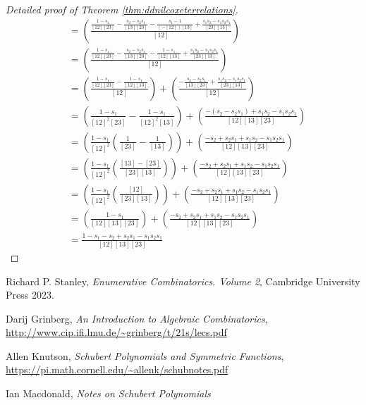 \documentclass{article}
\begin{document}
\begin{proof}[Detailed proof of Theorem \ref{thm:ddnilcoxeterrelations}]
\begin{align*}
        &= \left(\frac{\frac{1 - s_1}{[12][23]} - \frac{s_2 - s_2s_1}{[13][23]} - \frac{s_1 - 1}{(-[12])[13]} + \frac{s_1s_2 - s_1s_2s_1}{[23][13]}}{[12]}\right) \\
        &= \left(\frac{\frac{1 - s_1}{[12][23]} - \frac{s_2 - s_2s_1}{[13][23]} - \frac{1 - s_1}{[12][13]} + \frac{s_1s_2 - s_1s_2s_1}{[23][13]}}{[12]}\right) \\
        &= \left(\frac{\frac{1-s_1}{[12][23]} - \frac{1-s_1}{[12][13]}}{[12]}\right) +\left(\frac{-\frac{s_2 - s_2s_1}{[13][23]} + \frac{s_1s_2 - s_1s_2s_1}{[23][13]}}{[12]}\right) \\
        &= \left(\frac{1-s_1}{[12]^2[23]} - \frac{1-s_1}{[12]^2[13]}\right) + \left(\frac{-(s_2 - s_2s_1) + s_1s_2 - s_1s_2s_1}{[12][13][23]}\right)\\
        &= \left(\frac{1-s_1}{[12]^2}\left(\frac{1}{[23]}-\frac{1}{[13]}\right)\right) + \left(\frac{-s_2 + s_2s_1 + s_1s_2 - s_1s_2s_1}{[12][13][23]}\right)\\
        &= \left(\frac{1-s_1}{[12]^2}\left(\frac{[13]-[23]}{[23][13]}\right)\right) + \left(\frac{-s_2 + s_2s_1 + s_1s_2 - s_1s_2s_1}{[12][13][23]}\right)\\
        &= \left(\frac{1-s_1}{[12]^2}\left(\frac{[12]}{[23][13]}\right)\right) + \left(\frac{-s_2 + s_2s_1 + s_1s_2 - s_1s_2s_1}{[12][13][23]}\right)\\
        &= \left(\frac{1-s_1}{[12][13][23]}\right) + \left(\frac{-s_2 + s_2s_1 + s_1s_2 - s_1s_2s_1}{[12][13][23]}\right)\\
        &= \frac{1-s_1-s_2+s_2s_1-s_1s_2s_1}{[12][13][23]}    
    \end{align*}
\end{proof}



\begin{thebibliography}{999999999}
    \footnotesize \raggedright
    Richard P. Stanley, \textit{Enumerative Combinatorics. Volume 2}, Cambridge University Press 2023.

    Darij Grinberg, \textit{An Introduction to Algebraic Combinatorics}, \url{http://www.cip.ifi.lmu.de/~grinberg/t/21s/lecs.pdf}

    Allen Knutson, \textit{Schubert Polynomials and Symmetric Functions}, \url{https://pi.math.cornell.edu/~allenk/schubnotes.pdf}

    Ian Macdonald, \textit{Notes on Schubert Polynomials}
\end{thebibliography}
\end{document}
